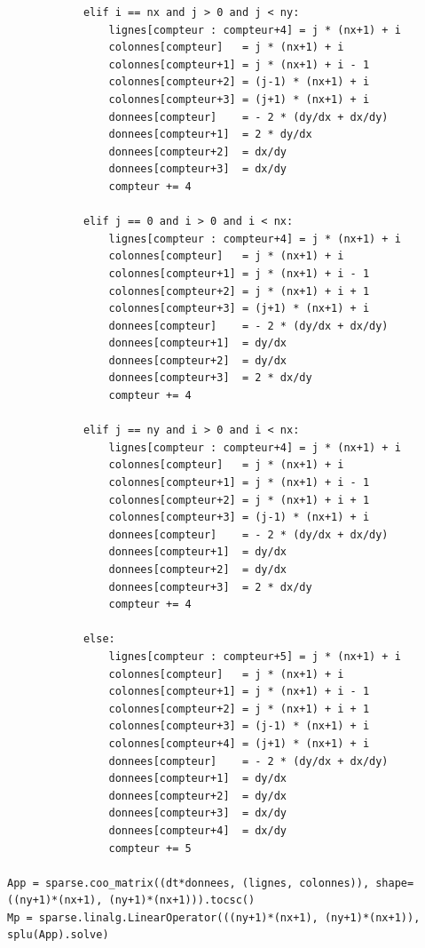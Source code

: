 \begin{verbatim}
            elif i == nx and j > 0 and j < ny:
                lignes[compteur : compteur+4] = j * (nx+1) + i
                colonnes[compteur]   = j * (nx+1) + i
                colonnes[compteur+1] = j * (nx+1) + i - 1
                colonnes[compteur+2] = (j-1) * (nx+1) + i
                colonnes[compteur+3] = (j+1) * (nx+1) + i
                donnees[compteur]    = - 2 * (dy/dx + dx/dy)
                donnees[compteur+1]  = 2 * dy/dx
                donnees[compteur+2]  = dx/dy
                donnees[compteur+3]  = dx/dy
                compteur += 4

            elif j == 0 and i > 0 and i < nx:
                lignes[compteur : compteur+4] = j * (nx+1) + i
                colonnes[compteur]   = j * (nx+1) + i
                colonnes[compteur+1] = j * (nx+1) + i - 1
                colonnes[compteur+2] = j * (nx+1) + i + 1
                colonnes[compteur+3] = (j+1) * (nx+1) + i
                donnees[compteur]    = - 2 * (dy/dx + dx/dy)
                donnees[compteur+1]  = dy/dx
                donnees[compteur+2]  = dy/dx
                donnees[compteur+3]  = 2 * dx/dy
                compteur += 4

            elif j == ny and i > 0 and i < nx:
                lignes[compteur : compteur+4] = j * (nx+1) + i
                colonnes[compteur]   = j * (nx+1) + i
                colonnes[compteur+1] = j * (nx+1) + i - 1
                colonnes[compteur+2] = j * (nx+1) + i + 1
                colonnes[compteur+3] = (j-1) * (nx+1) + i
                donnees[compteur]    = - 2 * (dy/dx + dx/dy)
                donnees[compteur+1]  = dy/dx
                donnees[compteur+2]  = dy/dx
                donnees[compteur+3]  = 2 * dx/dy
                compteur += 4
                        
            else:
                lignes[compteur : compteur+5] = j * (nx+1) + i
                colonnes[compteur]   = j * (nx+1) + i
                colonnes[compteur+1] = j * (nx+1) + i - 1
                colonnes[compteur+2] = j * (nx+1) + i + 1
                colonnes[compteur+3] = (j-1) * (nx+1) + i
                colonnes[compteur+4] = (j+1) * (nx+1) + i
                donnees[compteur]    = - 2 * (dy/dx + dx/dy)
                donnees[compteur+1]  = dy/dx
                donnees[compteur+2]  = dy/dx
                donnees[compteur+3]  = dx/dy
                donnees[compteur+4]  = dx/dy
                compteur += 5
    
App = sparse.coo_matrix((dt*donnees, (lignes, colonnes)), shape=((ny+1)*(nx+1), (ny+1)*(nx+1))).tocsc()
Mp = sparse.linalg.LinearOperator(((ny+1)*(nx+1), (ny+1)*(nx+1)), splu(App).solve)
\end{verbatim}

